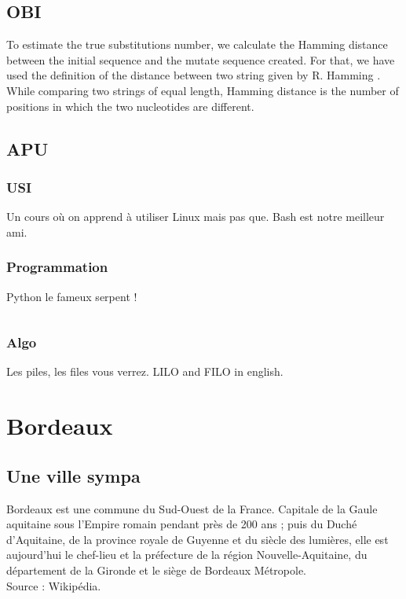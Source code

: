 \documentclass[10 pt]{report} %
\begin{document}
        
        
    \section{OBI}

        To estimate the true substitutions number, we calculate the Hamming distance between the initial sequence and the mutate sequence created. For that, we have used the definition of the distance between two string given by R. Hamming \cite{hamming_error_1950}. While comparing two strings of equal length, Hamming distance is the number of positions in which the two nucleotides are different.\\
    \section{APU}
        \subsection{USI}
            Un cours où on apprend à utiliser Linux mais pas que. Bash est notre meilleur ami.
        \subsection{Programmation}
            Python le fameux serpent !
            \inputminted{python}{hamming_function.py}
        \subsection{Algo}
            Les piles, les files vous verrez. LILO and FILO in english.
    
    
    
\chapter{Bordeaux}
    \section{Une ville sympa}
        Bordeaux est une commune du Sud-Ouest de la France. Capitale de la Gaule aquitaine sous l'Empire romain pendant près de 200 ans ; puis du Duché d'Aquitaine, de la province royale de Guyenne et du siècle des lumières, elle est aujourd'hui le chef-lieu et la préfecture de la région Nouvelle-Aquitaine, du département de la Gironde et le siège de Bordeaux Métropole.\\ Source : Wikipédia.
        
\end{document}
